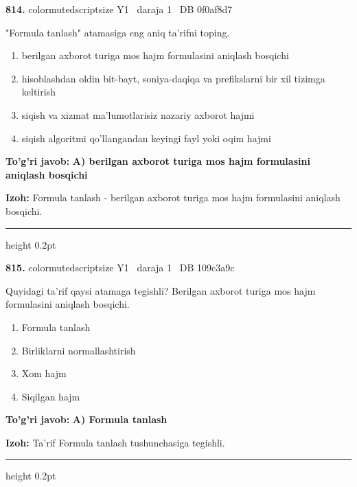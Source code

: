 \documentclass[10pt,a4paper,oneside]{article}
\begin{document}
\noindent\textbf{\color{ink}814.}  {color{muted}scriptsize Y1 \textbullet\ daraja 1 \textbullet\ DB 0f0af8d7}
\par
"Formula tanlash" atamasiga eng aniq ta'rifni toping.
\begin{enumerate}[label=\Alph*),leftmargin=9mm]
\item berilgan axborot turiga mos hajm formulasini aniqlash bosqichi
\item hisoblashdan oldin bit-bayt, soniya-daqiqa va prefikslarni bir xil tizimga keltirish
\item siqish va xizmat ma'lumotlarisiz nazariy axborot hajmi
\item siqish algoritmi qo'llangandan keyingi fayl yoki oqim hajmi
\end{enumerate}
\begin{tcolorbox}[enhanced,breakable,colback=teal!4,colframe=teal!50!black,boxrule=0.5pt,arc=1.1mm,left=3mm,right=3mm,top=1.7mm,bottom=1.7mm,before skip=2mm,after skip=2mm]
\textbf{\color{teal}To'g'ri javob:} \textbf{A) berilgan axborot turiga mos hajm formulasini aniqlash bosqichi}
\par\smallskip
\textbf{Izoh:} Formula tanlash - berilgan axborot turiga mos hajm formulasini aniqlash bosqichi.
\end{tcolorbox}
\vspace{2mm}\hrule height 0.2pt \vspace{3mm}

\noindent\textbf{\color{ink}815.}  {color{muted}scriptsize Y1 \textbullet\ daraja 1 \textbullet\ DB 109c3a9c}
\par
Quyidagi ta'rif qaysi atamaga tegishli? Berilgan axborot turiga mos hajm formulasini aniqlash bosqichi.
\begin{enumerate}[label=\Alph*),leftmargin=9mm]
\item Formula tanlash
\item Birliklarni normallashtirish
\item Xom hajm
\item Siqilgan hajm
\end{enumerate}
\begin{tcolorbox}[enhanced,breakable,colback=teal!4,colframe=teal!50!black,boxrule=0.5pt,arc=1.1mm,left=3mm,right=3mm,top=1.7mm,bottom=1.7mm,before skip=2mm,after skip=2mm]
\textbf{\color{teal}To'g'ri javob:} \textbf{A) Formula tanlash}
\par\smallskip
\textbf{Izoh:} Ta'rif Formula tanlash tushunchasiga tegishli.
\end{tcolorbox}
\vspace{2mm}\hrule height 0.2pt \vspace{3mm}
\end{document}
